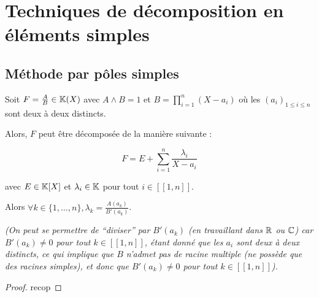 \documentclass[12pt, a4paper]{report}
\begin{document}
\section{Techniques de décomposition en éléments simples}

\subsection{Méthode par pôles simples}

\begin{property}
    Soit $F = \frac AB \in \mathbb{K}(X)$ avec $A\wedge B = 1$ et $B = \prod_{i=1}^n (X - a_i)$ où les $(a_i)_{1\le i \le n}$ sont deux à deux distincts.

    Alors, $F$ peut être décomposée de la manière suivante :

    $$F = E + \sum_{i=1}^{n}\frac{\lambda_i}{X - a_i}$$
    
    avec $E \in \mathbb{K}[X]$ et $\lambda_i \in \mathbb{K}$ pour tout $i \in [\![1,n]\!]$.

    Alors $\forall k \in \{1,\dots,n\}, \lambda_k = \frac{A(a_k)}{B'(a_k)}$.

    \textit{(On peut se permettre de ``diviser'' par $B'(a_k)$ (en travaillant dans $\mathbb{R}$ ou $\mathbb{C}$) car $B'(a_k) \neq 0$ pour tout $k \in [\![1,n]\!]$, étant donné que les $a_i$ sont deux à deux distincts, ce qui implique que $B$ n'admet pas de racine multiple (ne possède que des racines simples), et donc que $B'(a_k) \neq 0$ pour tout $k \in [\![1,n]\!]$).}
\end{property}

\begin{proof}
    recop
\end{proof}
\end{document}
